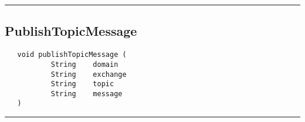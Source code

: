 \rule{15cm}{2pt}
\subsection{PublishTopicMessage}
\label{Api:PublishTopicMessage}
\begin{verbatim}
   void publishTopicMessage (
           String    domain
           String    exchange
           String    topic
           String    message
   )
\end{verbatim}



\rule{15cm}{2pt}
